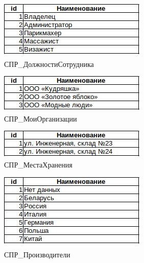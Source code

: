 \listoffigures %
\newpage

\thispagestyle{plain}
\pagestyle{plain}
\hspace{0pt}

\begin{figure}[!h]
    \centering

    \includegraphics[]
    {assets/etalons/CPR_DolzhnostiSotrudnika.jpg}

    \caption{СПР\_ДолжностиСотрудника}

    \label{fig:CPR_DolzhnostiSotrudnika}

\end{figure}

\begin{figure}[!h]
    \centering

    \includegraphics[]
    {assets/etalons/CPR_MoiOrganizacii.jpg}

    \caption{СПР\_МоиОрганизации}

    \label{fig:CPR_MoiOrganizacii}
\end{figure}

\begin{figure}[!h]
    \centering

    \includegraphics[]
    {assets/etalons/CPR_MestaHraneniay.jpg}

    \caption{СПР\_МестаХранения}
    
    \label{fig:CPR_MestaHraneniay}
\end{figure}

\begin{figure}[!h]
    \centering

    \includegraphics[]
    {assets/etalons/CPR_Proizvoditeli.jpg}

    \caption{СПР\_Производители}

    \label{fig:CPR_Proizvoditeli}
\end{figure}

